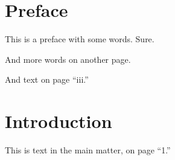 \documentclass{stml-l}
\begin{document}
\frontmatter
\chapter*{Preface}
This is a preface with some %
words. Sure.

\newpage

And %
more words on another page.

\newpage

And text on page ``iii.''

\mainmatter

\chapter{Introduction}
This %
is text in %
the main matter, on page ``1.''
\end{document}
